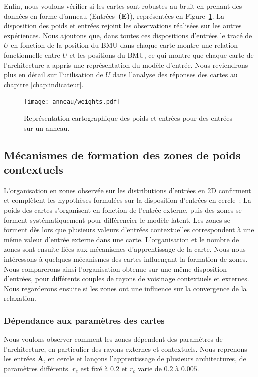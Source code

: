 \documentclass[../main]{subfiles}
\begin{document}
Enfin, nous voulons vérifier si les cartes sont robustes au bruit en prenant des données en forme d'anneau (Entrées~\textbf{(E)}), représentées en Figure~\ref{fig:anneau_w}. La disposition des poids et entrées rejoint les observations réalisées sur les autres expériences.
Nous ajoutons que, dans toutes ces dispositions d'entrées le tracé de $U$ en fonction de la position du BMU dans chaque carte montre une relation fonctionnelle entre $U$ et les positions du BMU, ce qui montre que chaque carte de l'architecture a appris une représentation du modèle d'entrée. Nous reviendrons plus en détail sur l'utilisation de $U$ dans l'analyse des réponses des cartes au chapitre \ref{chap:indicateur}.
\begin{figure}[H]
	\centering\texttt{[image: anneau/weights.pdf]}
	\caption{Représentation cartographique des poids et entrées pour des entrées sur un anneau. \label{fig:anneau_w}}
\end{figure}

\subsection{Mécanismes de formation des zones de poids contextuels}

L'organisation en zones observée sur les distributions d'entrées en 2D confirment et complètent les hypothèses formulées sur la disposition d'entrées en cercle~:
La poids des cartes s'organisent en fonction de l'entrée externe, puis des zones se forment systématiquement pour différencier le modèle latent. Les zones se forment dès lors que plusieurs valeurs d'entrées contextuelles correspondent à une même valeur d'entrée externe dans une carte.
L'organisation et le nombre de zones sont ensuite liées aux mécanismes d'apprentissage de la carte.
Nous nous intéressons à quelques mécanismes des cartes influençant la formation de zones. 
Nous comparerons ainsi l'organisation obtenue sur une même disposition d'entrées, pour différents couples de rayons de voisinage contextuels et externes. 
Nous regarderons ensuite si les zones ont une influence sur la convergence de la relaxation.

\subsubsection{Dépendance aux paramètres des cartes}

Nous voulons observer comment les zones dépendent des paramètres de l'architecture, en particulier des rayons externes et contextuels.
Nous reprenons les entrées \textbf{A}, en cercle et lançons l'apprentissage de plusieurs architectures, de paramètres différents. $r_e$ est fixé à $0.2$ et $r_c$ varie de $0.2$ à $0.005$. 
\end{document}
